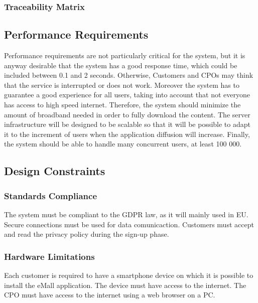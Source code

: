 \subsubsection{Traceability Matrix}
\subsection{Performance Requirements}

Performance requirements are not particularly critical for the system, but it is anyway desirable that the system has a good response time, which could be included between 0.1 and 2 seconds.
Otherwise, Customers and CPOs may think that the service is interrupted or does not work.
Moreover the system has to guarantee a good experience for all users, taking into account that not everyone has access to high speed internet. Therefore,
the system should minimize the amount of broadband needed in order to fully
download the content.
The server infrastructure will be designed to be scalable so that it will be possible to adapt it to
the increment of users when the application diffusion will increase.
Finally, the system should be able to handle many concurrent users, at least
100 000.
\subsection{Design Constraints}
\subsubsection{Standards Compliance}

The system must be compliant to the GDPR law, as it will mainly used in EU. \newline
Secure connections must be used for data comunicaction. \newline
Customers must accept and read the privacy policy during the sign-up phase. \newline

\subsubsection{Hardware Limitations}

Each customer is required to have a smartphone device on which it is possible to install the eMall application. The device must have access to the internet. \newline
The CPO must have access to the internet using a web browser on a PC.  



